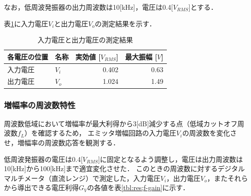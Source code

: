 \documentclass[dvipdfmx,titlepage,a4j]{jsarticle}  %
\numberwithin{equation}{section}
\begin{document}
なお，低周波発振器の出力周波数は10[kHz]，電圧は0.4[$V_{RMS}$]とする．

表\ref{tbl:res;gain}に入力電圧$V_i$と出力電圧$V_o$の測定結果を示す．
\begin{table}[H]
  \caption{入力電圧と出力電圧の測定結果}
  \begin{center}
    \begin{tabular}{l|l|r|r}
      \hline
      各電圧の位置 & 名称  & \multicolumn{1}{l|}{実効値 [$V_{RMS}$]} & \multicolumn{1}{l}{最大振幅 [$V$]} \\ \hline\hline
      入力電圧     & $V_i$ & 0.402                                   & 0.63                               \\ \hline
      出力電圧     & $V_o$ & 1.024                                   & 1.49                               \\ \hline
    \end{tabular}
  \end{center}
  \label{tbl:res;gain}
\end{table}

\subsubsection{増幅率の周波数特性}
周波数低域において増幅率が最大利得から3[dB]減少する点（低域カットオフ周波数$f_L$）を確認するため，
エミッタ増幅回路の入力電圧$V_i$の周波数を変化させ，増幅率の周波数応答を観測する．

低周波発振器の電圧は0.4[$V_{RMS}$]に固定となるよう調整し，電圧は出力周波数は10[kHz]から100[kHz]まで適宜変化させた．
このときの周波数に対するデジタルマルチメータ（直流レンジ）で測定した，入力電圧$V_i$，出力電圧$V_o$，またそれらから導出できる電圧利得$G_V$の各値を表\ref{tbl:res;f-gain}に示す．
\end{document}
